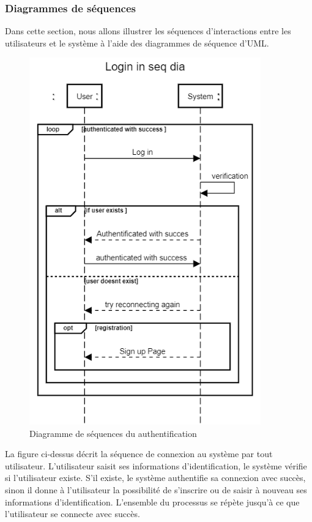 \documentclass[french, a4paper, 12pt]{report}
\begin{document}
		\subsubsection{Diagrammes de séquences} Dans cette section, nous allons illustrer les séquences d'interactions entre les utilisateurs et le système à l'aide des diagrammes de séquence d'UML.
			\begin{figure}[!h]
  				\center
  				\includegraphics[width=10cm]{seqlogin.png}
  				\caption{Diagramme de séquences du authentification}
  				\label{fig:seqlogin}
			\end{figure} La figure ci-dessus décrit la séquence de connexion au système par tout utilisateur. L'utilisateur saisit ses informations d'identification, le système vérifie si l'utilisateur existe. S'il existe, le système authentifie sa connexion avec succès, sinon il donne à l'utilisateur la possibilité de s'inscrire ou de saisir à nouveau ses informations d'identification. L'ensemble du processus se répète jusqu'à ce que l'utilisateur se connecte avec succès.
			
\end{document}
